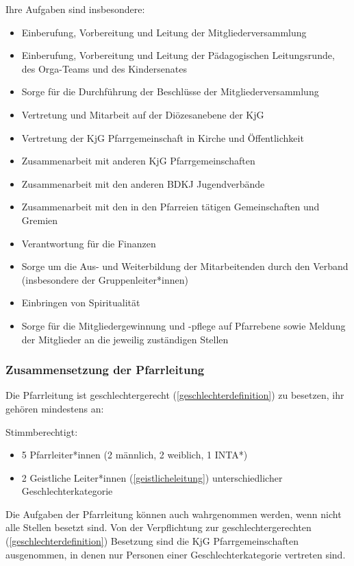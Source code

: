 \documentclass[12pt]{report}
\begin{document}
\begin{justify}
Ihre Aufgaben sind insbesondere:
\begin{itemize}
  \item Einberufung, Vorbereitung und Leitung der Mitgliederversammlung
  \item Einberufung, Vorbereitung und Leitung der Pädagogischen Leitungsrunde, des Orga-Teams und des Kindersenates
  \item Sorge für die Durchführung der Beschlüsse der Mitgliederversammlung
  \item Vertretung und Mitarbeit auf der Diözesanebene der KjG
  \item Vertretung der KjG Pfarrgemeinschaft in Kirche und Öffentlichkeit
  \item Zusammenarbeit mit anderen KjG Pfarrgemeinschaften
  \item Zusammenarbeit mit den anderen BDKJ Jugendverbände
  \item Zusammenarbeit mit den in den Pfarreien tätigen Gemeinschaften und Gremien
  \item Verantwortung für die Finanzen
  \item Sorge um die Aus- und Weiterbildung der Mitarbeitenden durch den Verband (insbesondere der Gruppenleiter*innen)
  \item Einbringen von Spiritualität
  \item Sorge für die Mitgliedergewinnung und -pflege auf Pfarrebene
        sowie Meldung der Mitglieder an die jeweilig zuständigen Stellen
\end{itemize}

\subsubsection{Zusammensetzung der Pfarrleitung}

Die Pfarrleitung ist geschlechtergerecht (\ref{geschlechterdefinition}) zu
besetzen, ihr gehören mindestens an:

Stimmberechtigt:
\begin{itemize}
  \item 5 Pfarrleiter*innen (2 männlich, 2 weiblich, 1 INTA*)
  \item 2 Geistliche Leiter*innen (\ref{geistlicheleitung}) unterschiedlicher Geschlechterkategorie
\end{itemize}
Die Aufgaben der Pfarrleitung können auch wahrgenommen werden, wenn nicht alle Stellen besetzt sind.
Von der Verpflichtung zur geschlechtergerechten (\ref{geschlechterdefinition})
Besetzung sind die KjG Pfarrgemeinschaften ausgenommen, in
denen nur Personen einer Geschlechterkategorie vertreten sind.


\end{justify}
\end{document}
